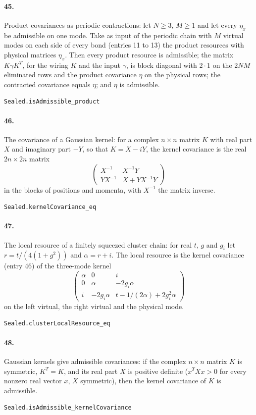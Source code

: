 \documentclass[11pt]{article}
\begin{document}
\paragraph{45.} Product covariances as periodic contractions: let $N \ge 3$, $M \ge 1$ and let every $\eta_x$ be admissible on one mode. Take as input of the periodic chain with $M$ virtual modes on each side of every bond (entries 11 to 13) the product resources with physical matrices $\eta_x$. Then every product resource is admissible; the matrix $K\gamma K^T$, for the wiring $K$ and the input $\gamma$, is block diagonal with $2 \cdot 1$ on the $2NM$ eliminated rows and the product covariance $\eta$ on the physical rows; the contracted covariance equals $\eta$; and $\eta$ is admissible.\par{\footnotesize\texttt{Sealed.isAdmissible\_product}}

\paragraph{46.} The covariance of a Gaussian kernel: for a complex $n \times n$ matrix $K$ with real part $X$ and imaginary part $-Y$, so that $K = X - iY$, the kernel covariance is the real $2n \times 2n$ matrix \[\begin{pmatrix} X^{-1} & X^{-1}Y \\ YX^{-1} & X + YX^{-1}Y \end{pmatrix}\] in the blocks of positions and momenta, with $X^{-1}$ the matrix inverse.\par{\footnotesize\texttt{Sealed.kernelCovariance\_eq}}

\paragraph{47.} The local resource of a finitely squeezed cluster chain: for real $t$, $g$ and $g_i$ let $r = t/(4(1 + g^2))$ and $\alpha = r + i$. The local resource is the kernel covariance (entry 46) of the three-mode kernel \[\begin{pmatrix} \alpha & 0 & i \\ 0 & \alpha & -2g_i\alpha \\ i & -2g_i\alpha & t - 1/(2\alpha) + 2g_i^2\alpha \end{pmatrix}\] on the left virtual, the right virtual and the physical mode.\par{\footnotesize\texttt{Sealed.clusterLocalResource\_eq}}

\paragraph{48.} Gaussian kernels give admissible covariances: if the complex $n \times n$ matrix $K$ is symmetric, $K^T = K$, and its real part $X$ is positive definite ($x^T X x > 0$ for every nonzero real vector $x$, $X$ symmetric), then the kernel covariance of $K$ is admissible.\par{\footnotesize\texttt{Sealed.isAdmissible\_kernelCovariance}}
\end{document}
